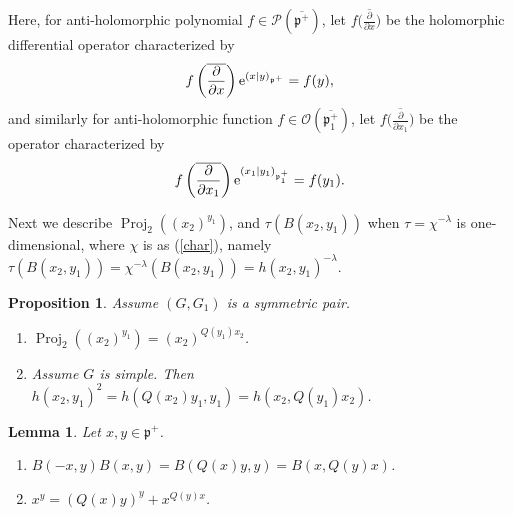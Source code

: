 \documentclass[pdftex]{sigma}
\numberwithin{equation}{section}
\newtheorem{Lemma}[Theorem]{Lemma}
\newtheorem{Proposition}[Theorem]{Proposition}
{ \theoremstyle{definition}
\newtheorem{Definition}[Theorem]{Definition}
\newtheorem{Note}[Theorem]{Note}
\newtheorem{Example}[Theorem]{Example}
\newtheorem{Remark}[Theorem]{Remark} }
\newcommand{\fp}{\mathfrak{p}}
\newcommand{\cO}{\mathcal{O}}
\newcommand{\cP}{\mathcal{P}}
\newcommand{\Proj}{\operatorname{Proj}}
\begin{document}
Here, for anti-holomorphic polynomial $f\in\cP(\overline{\fp^+})$, let $f\big(\overline{\frac{\partial}{\partial x}}\big)$ be the
holomorphic differential operator characterized by
\begin{gather*} f\left(\overline{\frac{\partial}{\partial x}}\right){\rm e}^{(x|y)_{\fp^+}}=f(y), \end{gather*}
and similarly for anti-holomorphic function $f\in\cO(\overline{\fp^+_1})$, let $f\big(\overline{\frac{\partial}{\partial x_1}}\big)$ be the
operator characterized by
\begin{gather*} f\left(\overline{\frac{\partial}{\partial x_1}}\right){\rm e}^{(x_1|y_1)_{\fp^+_1}}=f(y_1). \end{gather*}

Next we describe $\Proj_2((x_2)^{y_1})$, and $\tau(B(x_2,y_1))$ when $\tau=\chi^{-\lambda}$ is one-dimensional, where $\chi$ is as (\ref{char}),
namely $\tau(B(x_2,y_1))=\chi^{-\lambda}(B(x_2,y_1))=h(x_2,y_1)^{-\lambda}$.
\begin{Proposition}\label{projprop}
Assume $(G,G_1)$ is a symmetric pair.
\begin{enumerate}\itemsep=0pt
\item[$(1)$] $\Proj_2((x_2)^{y_1})=(x_2)^{Q(y_1)x_2}$.
\item[$(2)$] Assume $G$ is simple. Then $h(x_2,y_1)^2=h(Q(x_2)y_1,y_1)=h(x_2,Q(y_1)x_2)$.
\end{enumerate}
\end{Proposition}
\begin{Lemma}\label{projlemma}
Let $x,y\in\fp^+$.
\begin{enumerate}\itemsep=0pt
\item[$(1)$] $B(-x,y)B(x,y)=B(Q(x)y,y)=B(x,Q(y)x)$.
\item[$(2)$] $x^y=(Q(x)y)^y+x^{Q(y)x}$.
\end{enumerate}
\end{Lemma}
\end{document}
